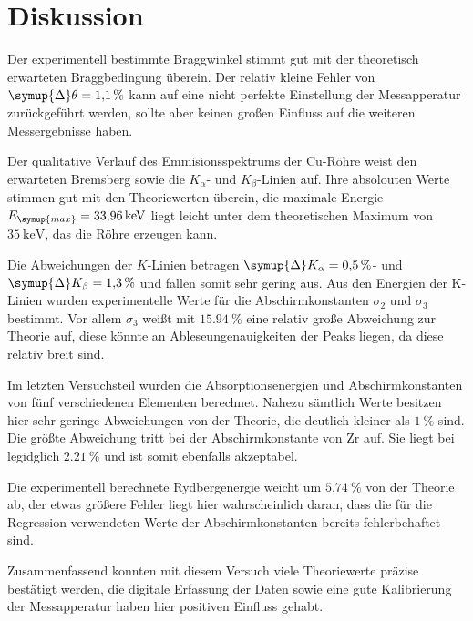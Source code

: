 \section{Diskussion}
\label{sec:Diskussion}
Der experimentell bestimmte Braggwinkel stimmt gut mit der theoretisch erwarteten Braggbedingung überein.
Der relativ kleine Fehler von $\symup{\Delta}\theta = \qty{1,1}{\percent}$ kann auf eine nicht
perfekte Einstellung der Messapperatur zurückgeführt werden, sollte aber keinen großen Einfluss auf die
weiteren Messergebnisse haben.

Der qualitative Verlauf des Emmisionsspektrums der Cu-Röhre weist den erwarteten Bremsberg
sowie die $K_{\alpha}$- und $K_{\beta}$-Linien auf. Ihre absolouten Werte stimmen gut
mit den Theoriewerten überein, die maximale Energie $E_{\symup{max}} = \qty{33.96}{\kilo\electronvolt}$
liegt leicht unter dem theoretischen Maximum von $\qty{35}{\kilo\electronvolt}$, das die Röhre
erzeugen kann.

Die Abweichungen der $K$-Linien betragen $\symup{\Delta}K_{\alpha}=\qty{0,5}{\percent}$- und
$\symup{\Delta}K_{\beta}=\qty{1,3}{\percent}$ und fallen somit sehr gering aus.
Aus den Energien der K-Linien wurden experimentelle Werte für die Abschirmkonstanten
$\sigma_2$ und $\sigma_3$ bestimmt. Vor allem $\sigma_3$ weißt mit $\qty{15,94}{\percent}$ eine
relativ große Abweichung zur Theorie auf, diese könnte an Ableseungenauigkeiten der Peaks liegen,
da diese relativ breit sind.

Im letzten Versuchsteil wurden die Absorptionsenergien und Abschirmkonstanten von fünf verschiedenen Elementen
berechnet. Nahezu sämtlich Werte besitzen hier sehr geringe Abweichungen von der Theorie, die deutlich kleiner als
$\qty{1}{\percent}$ sind. Die größte Abweichung tritt bei der Abschirmkonstante von Zr auf.
Sie liegt bei legidglich $\qty{2,21}{\percent}$ und ist somit ebenfalls akzeptabel.

Die experimentell berechnete Rydbergenergie weicht um  $\qty{5,74}{\percent}$ von der Theorie ab,
der etwas größere Fehler liegt hier wahrscheinlich daran, dass die für die Regression verwendeten Werte
der Abschirmkonstanten bereits fehlerbehaftet sind.

Zusammenfassend konnten mit diesem Versuch viele Theoriewerte präzise bestätigt werden, die digitale Erfassung
der Daten sowie eine gute Kalibrierung der Messapperatur haben hier positiven Einfluss gehabt.

